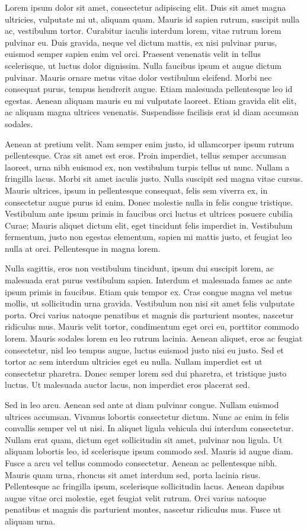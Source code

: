 Lorem ipsum dolor sit amet, consectetur adipiscing elit. Duis sit amet magna ultricies, vulputate mi ut, aliquam quam. Mauris id sapien rutrum, suscipit nulla ac, vestibulum tortor. Curabitur iaculis interdum lorem, vitae rutrum lorem pulvinar eu. Duis gravida, neque vel dictum mattis, ex nisi pulvinar purus, euismod semper sapien enim vel orci. Praesent venenatis velit in tellus scelerisque, ut luctus dolor dignissim. Nulla faucibus ipsum et augue dictum pulvinar. Mauris ornare metus vitae dolor vestibulum eleifend. Morbi nec consequat purus, tempus hendrerit augue. Etiam malesuada pellentesque leo id egestas. Aenean aliquam mauris eu mi vulputate laoreet. Etiam gravida elit elit, ac aliquam magna ultrices venenatis. Suspendisse facilisis erat id diam accumsan sodales.

Aenean at pretium velit. Nam semper enim justo, id ullamcorper ipsum rutrum pellentesque. Cras sit amet est eros. Proin imperdiet, tellus semper accumsan laoreet, urna nibh euismod ex, non vestibulum turpis tellus ut nunc. Nullam a fringilla lacus. Morbi sit amet iaculis justo. Nulla suscipit sed magna vitae cursus. Mauris ultrices, ipsum in pellentesque consequat, felis sem viverra ex, in consectetur augue purus id enim. Donec molestie nulla in felis congue tristique. Vestibulum ante ipsum primis in faucibus orci luctus et ultrices posuere cubilia Curae; Mauris aliquet dictum elit, eget tincidunt felis imperdiet in. Vestibulum fermentum, justo non egestas elementum, sapien mi mattis justo, et feugiat leo nulla at orci. Pellentesque in magna lorem.

Nulla sagittis, eros non vestibulum tincidunt, ipsum dui suscipit lorem, ac malesuada erat purus vestibulum sapien. Interdum et malesuada fames ac ante ipsum primis in faucibus. Etiam quis tempor ex. Cras congue magna vel metus mollis, ut sollicitudin urna gravida. Vestibulum non nisi sit amet felis vulputate porta. Orci varius natoque penatibus et magnis dis parturient montes, nascetur ridiculus mus. Mauris velit tortor, condimentum eget orci eu, porttitor commodo lorem. Mauris sodales lorem eu leo rutrum lacinia. Aenean aliquet, eros ac feugiat consectetur, nisl leo tempus augue, luctus euismod justo nisi eu justo. Sed et tortor ac sem interdum ultricies eget eu nulla. Nullam imperdiet est ut consectetur pharetra. Donec semper lorem sed dui pharetra, et tristique justo luctus. Ut malesuada auctor lacus, non imperdiet eros placerat sed.

Sed in leo arcu. Aenean sed ante at diam pulvinar congue. Nullam euismod ultrices accumsan. Vivamus lobortis consectetur dictum. Nunc ac enim in felis convallis semper vel ut nisi. In aliquet ligula vehicula dui interdum consectetur. Nullam erat quam, dictum eget sollicitudin sit amet, pulvinar non ligula. Ut aliquam lobortis leo, id scelerisque ipsum commodo sed. Mauris id augue diam. Fusce a arcu vel tellus commodo consectetur. Aenean ac pellentesque nibh. Mauris quam urna, rhoncus sit amet interdum sed, porta lacinia risus. Pellentesque ac fringilla ipsum, scelerisque sollicitudin lacus. Aenean dapibus augue vitae orci molestie, eget feugiat velit rutrum. Orci varius natoque penatibus et magnis dis parturient montes, nascetur ridiculus mus. Fusce ut aliquam urna.

